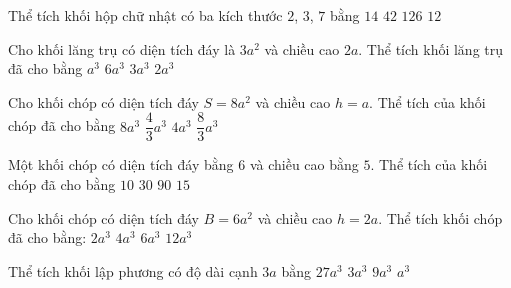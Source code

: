 \begin{ex}%
	Thể tích khối hộp chữ nhật có ba kích thước $2$,  $3$, $7$ bằng
	 \choice
		 {$14$}
		{\True  $42$}
		 {$126$}
		 {$12$}
\end{ex}

\begin{ex}%
	Cho khối lăng trụ có diện tích đáy là $3a^2$ và chiều cao $2a$. Thể tích khối lăng trụ đã cho bằng 
	 \choice
		{$a^3$} 
		{\True $6a^3$} 
		 {$3a^3$}
		 {$2a^3$}
\end{ex}

\begin{ex}%
	Cho khối chóp có diện tích đáy $S=8a^2$ và chiều cao $h=a$. Thể tích của khối chóp đã  cho bằng
	 \choice
		{$8  a^3$}
		{$\dfrac{4}{3}a^3$} 
		{$4 a^3$} 
		{\True $\dfrac{8}{3}a^3$} 
\end{ex}

\begin{ex}%
	Một khối chóp có diện tích đáy bằng $6$ và chiều cao bằng $5$. Thể tích của khối  chóp đã cho bằng
	 \choice
		{\True  $10$}
		{$30$} 
		 {$90$}
		{$15$} 
\end{ex}

\begin{ex}%
	Cho khối chóp có diện tích đáy $B=6a^2$  và chiều cao $h=2a$. Thể tích khối chóp đã cho bằng:
	 \choice
		 {$2a^3$}
		{\True  $4a^3$}
		 {$6a^3$}
		{$12a^3$} 
\end{ex}

\begin{ex}%
	Thể  tích khối lập phương có độ dài cạnh $3a$ bằng
	 \choice
		{\True  $27a^3$}
		{$3a^3$} 
		{$9a^3$} 
		 {$a^3$}
\end{ex}


